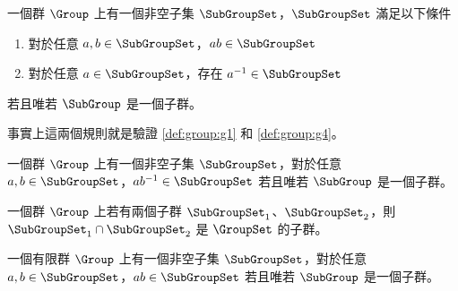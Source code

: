 \documentclass[12pt,a4paper,oneside]{report}
\begin{document}
\begin{CJK}{UTF8}{bkai}
\begin{mylma}[實用版子群]
\label{lma:group:two_rule_subgroup}
一個群 $\Group$ 上有一個非空子集 $\SubGroupSet$，$\SubGroupSet$ 滿足以下條件
\begin{enumerate}
\item 對於任意 $a,b\in{\SubGroupSet}$，$ab\in{\SubGroupSet}$
\item 對於任意 $a\in{\SubGroupSet}$，存在 $a^{-1}\in{\SubGroupSet}$
\end{enumerate}
若且唯若 $\SubGroup$ 是一個子群。
\end{mylma}
\begin{mynote*}
事實上這兩個規則就是驗證 \ref{def:group:g1} 和 \ref{def:group:g4}。
\end{mynote*}

\begin{mylma}[精簡版子群]
\label{lma:group:one_rule_subgroup}
一個群 $\Group$ 上有一個非空子集 $\SubGroupSet$，對於任意 $a,b\in{\SubGroupSet}$，$ab^{-1}\in{\SubGroupSet}$ 若且唯若 $\SubGroup$ 是一個子群。
\end{mylma}

\begin{mypropo}
\label{pro:group:two_subgroup_intersection}
一個群 $\Group$ 上若有兩個子群 $\SubGroupSet_1$、$\SubGroupSet_2$，則 ${\SubGroupSet_1}\cap{\SubGroupSet_2}$ 是 $\GroupSet$ 的子群。
\end{mypropo}

\begin{mythm}[有限子群]
一個有限群 $\Group$ 上有一個非空子集 $\SubGroupSet$，對於任意 $a,b\in{\SubGroupSet}$，$ab\in{\SubGroupSet}$ 若且唯若 $\SubGroup$ 是一個子群。
\end{mythm}


\ifx \allfiles \undefined
\printindex[noun]

\clearpage
\end{CJK}
\end{document}
